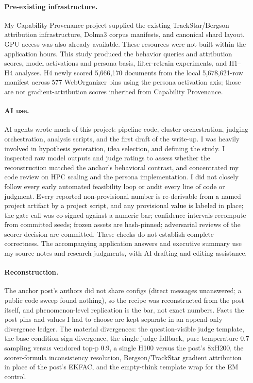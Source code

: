 \paragraph{Pre-existing infrastructure.} My Capability Provenance project
\citep{matlin2026capability} supplied the existing TrackStar/Bergson
attribution infrastructure, Dolma3 corpus manifests, and canonical shard
layout. GPU access was also already available. These resources were not
built within the application hours. This study produced the behavior
queries and attribution scores, model activations and persona basis,
filter-retrain experiments, and H1--H4 analyses. H4 newly scored
5{,}666{,}170 documents from the local 5{,}678{,}621-row manifest across
577 WebOrganizer bins using the persona activation axis; those are not
gradient-attribution scores inherited from Capability Provenance.

\paragraph{AI use.} AI agents wrote much of this project: pipeline code,
cluster orchestration, judging orchestration, analysis scripts, and the
first draft of the write-up. I was heavily involved in hypothesis generation,
idea selection, and defining the study. I inspected raw model outputs and
judge ratings to assess whether the reconstruction matched the anchor's
behavioral contrast, and concentrated my code review on HPC scaling and the
persona implementation. I did not closely follow every early automated
feasibility loop or audit every line of code or judgment.
Every reported non-provisional number is re-derivable from a
named project artifact by a project script, and any provisional value is
labeled in place; the gate call was co-signed against a numeric
bar; confidence intervals recompute from committed seeds; frozen assets
are hash-pinned; adversarial reviews of the scorer decision are
committed. These checks do not establish complete correctness. The
accompanying application answers and executive summary use my source notes
and research judgments, with AI drafting and editing assistance.

\paragraph{Reconstruction.} The anchor post's authors did not share
configs (direct messages unanswered; a public code sweep found nothing),
so the recipe was reconstructed from the post itself, and
phenomenon-level replication is the bar, not exact numbers. Facts the
post pins and values I had to choose are kept separate in an append-only
divergence ledger. The material divergences: the question-visible judge
template, the base-condition sign divergence, the single-judge fallback,
pure temperature-0.7 sampling versus vendored top-p 0.9, a single H100
versus the post's 8xH200, the scorer-formula inconsistency resolution,
Bergson/TrackStar gradient attribution in place of the post's EKFAC, and
the empty-think template wrap for the EM control.

